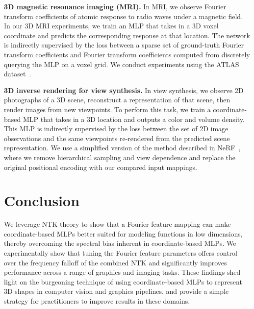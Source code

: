 {\bf 3D magnetic resonance imaging (MRI).} In MRI, we observe Fourier transform coefficients of atomic response to radio waves under a magnetic field. In our 3D MRI experiments, we train an MLP that takes in a 3D voxel coordinate and predicts the corresponding response at that location. The network is indirectly supervised by the loss between a sparse set of ground-truth Fourier transform coefficients and Fourier transform coefficients computed from discretely querying the MLP on a voxel grid. We conduct experiments using the ATLAS dataset~\cite{atlas}.

{\bf 3D inverse rendering for view synthesis.} In view synthesis, we observe 2D photographs of a 3D scene, reconstruct a representation of that scene, then render images from new viewpoints. To perform this task, we train a coordinate-based MLP that takes in a 3D location and outputs a color and volume density. This MLP is indirectly supervised by the loss between the set of 2D image observations and the same viewpoints re-rendered from the predicted scene representation. We use a simplified version of the method described in NeRF~\cite{mildenhall2020nerf}, where we remove hierarchical sampling and view dependence and replace the original positional encoding with our compared input mappings.

\section{Conclusion}
We leverage NTK theory to show that a Fourier feature mapping can make coordinate-based MLPs better suited for modeling functions in low dimensions, thereby overcoming the spectral bias inherent in coordinate-based MLPs. We experimentally show that tuning the Fourier feature parameters offers control over the frequency falloff of the combined NTK and significantly improves performance across a range of graphics and imaging tasks. These findings shed light on the burgeoning technique of using coordinate-based MLPs to represent 3D shapes in computer vision and graphics pipelines, and provide a simple strategy for practitioners to improve results in these domains. 


